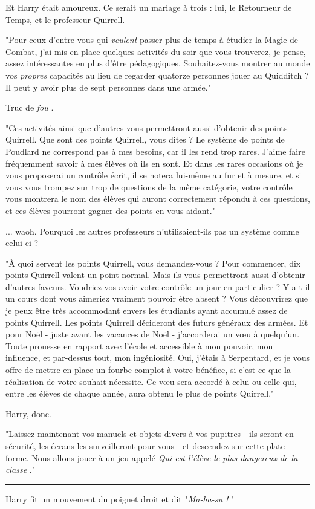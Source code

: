 Et Harry était amoureux. Ce serait un mariage à trois : lui, le Retourneur de Temps, et le professeur Quirrell.

"Pour ceux d'entre vous qui \emph{veulent}  passer plus de temps à étudier la Magie de Combat, j'ai mis en place quelques activités du soir que vous trouverez, je pense, assez intéressantes en plus d'être pédagogiques. Souhaitez-vous montrer au monde vos \emph{propres}  capacités au lieu de regarder quatorze personnes jouer au Quidditch ? Il peut y avoir plus de sept personnes dans une armée."

Truc de \emph{fou} .

"Ces activités ainsi que d'autres vous permettront aussi d'obtenir des points Quirrell. Que sont des points Quirrell, vous dites ? Le système de points de Poudlard ne correspond pas à mes besoins, car il les rend trop rares. J'aime faire fréquemment savoir à mes élèves où ils en sont. Et dans les rares occasions où je vous proposerai un contrôle écrit, il se notera lui-même au fur et à mesure, et si vous vous trompez sur trop de questions de la même catégorie, votre contrôle vous montrera le nom des élèves qui auront correctement répondu à ces questions, et ces élèves pourront gagner des points en vous aidant."

... waoh. Pourquoi les autres professeurs n'utilisaient-ils pas un système comme celui-ci ?

"À quoi servent les points Quirrell, vous demandez-vous ? Pour commencer, dix points Quirrell valent un point normal. Mais ils vous permettront aussi d'obtenir d'autres faveurs. Voudriez-vos avoir votre contrôle un jour en particulier ? Y a-t-il un cours dont vous aimeriez vraiment pouvoir être absent ? Vous découvrirez que je peux être très accommodant envers les étudiants ayant accumulé assez de points Quirrell. Les points Quirrell décideront des futurs généraux des armées. Et pour Noël - juste avant les vacances de Noël - j'accorderai un vœu à quelqu'un. Toute prouesse en rapport avec l'école et accessible à mon pouvoir, mon influence, et par-dessus tout, mon ingéniosité. Oui, j'étais à Serpentard, et je vous offre de mettre en place un fourbe complot à votre bénéfice, si c'est ce que la réalisation de votre souhait nécessite. Ce vœu sera accordé à celui ou celle qui, entre les élèves de chaque année, aura obtenu le plus de points Quirrell."

Harry, donc.

"Laissez maintenant vos manuels et objets divers à vos pupitres - ils seront en sécurité, les écrans les surveilleront pour vous - et descendez sur cette plate-forme. Nous allons jouer à un jeu appelé \emph{Qui est l'élève le plus dangereux de la classe} ."
\par\noindent\rule{\textwidth}{0.4pt}
Harry fit un mouvement du poignet droit et dit "\emph{Ma-ha-su !} "

